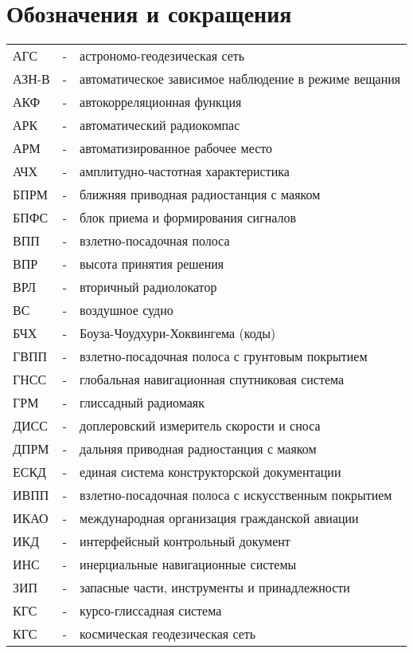 \section*{Обозначения и сокращения}
\label{cha:acro}

\begin{longtable}{lll}
АГС  & - & астрономо-геодезическая сеть \\ 
АЗН-В& - & автоматическое зависимое наблюдение в режиме вещания \\ 
АКФ  & - & автокорреляционная функция \\ 
АРК  & - & автоматический радиокомпас \\ 
АРМ  & - & автоматизированное рабочее место \\ 
АЧХ  & - & амплитудно-частотная характеристика \\ 
БПРМ & - & ближняя приводная радиостанция с маяком \\ 
БПФС & - & блок приема и формирования сигналов \\ 
ВПП  & - & взлетно-посадочная полоса \\ 
ВПР  & - & высота принятия решения \\ 
ВРЛ  & - & вторичный радиолокатор \\ 
ВС   & - & воздушное судно \\ 
БЧХ  & - & Боуза-Чоудхури-Хоквингема (коды) \\ 
ГВПП & - & взлетно-посадочная полоса с грунтовым покрытием \\ 
ГНСС & - & глобальная навигационная спутниковая система \\ 
ГРМ  & - & глиссадный радиомаяк \\ 
ДИСС & - & доплеровский измеритель скорости и сноса \\ 
ДПРМ & - & дальняя приводная радиостанция с маяком \\ 
ЕСКД & - & единая система конструкторской документации \\ 
ИВПП & - & взлетно-посадочная полоса с искусственным покрытием \\ 
ИКАО & - & международная организация гражданской авиации \\ 
ИКД  & - & интерфейсный контрольный документ \\ 
ИНС  & - & инерциальные навигационные системы \\ 
ЗИП  & - & запасные части, инструменты и принадлежности \\ 
КГС  & - & курсо-глиссадная система \\ 
КГС  & - & космическая геодезическая сеть \\ 

\end{longtable}
